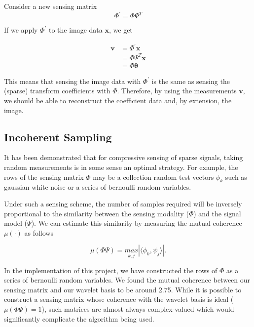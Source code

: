 \documentclass{IEEEtran}
\newcommand{\bfv}{\mathbf{v}}
\newcommand{\bfx}{\mathbf{x}}
\newcommand{\bftheta}{\mathbf{\theta}}
\begin{document}
Consider a new sensing matrix
\begin{equation}
  \label{eq:newsense}
  \Phi^\prime = \Phi \Psi^T
\end{equation}

If we apply $\Phi^\prime$ to the image data $\bfx$, we get

\begin{equation}
  \label{eq:newsenseapplied}
  \begin{split}
  \bfv &= \Phi^\prime \bfx \\
  &= \Phi \Psi^T \bfx \\
  &= \Phi \bftheta
  \end{split}
\end{equation}

This means that sensing the image data with $\Phi^\prime$ is the same as sensing the (sparse) transform coefficients with $\Phi$.  Therefore, by using the measurements $\bfv$, we should be able to reconstruct the coefficient data and, by extension, the image.

\subsection{Incoherent Sampling}
\label{sub:incoherence}

It has been demonstrated \cite{Candes06b,Baraniuk06} that for compressive sensing of sparse signals, taking random measurements is in some sense an optimal strategy. For example, the rows of the sensing matrix $\Phi$ may be a collection random test vectors ${\phi_k}$ such as gaussian white noise or a series of bernoulli random variables.

Under such a sensing scheme, the number of samples required will be inversely proportional to the similarity between the sensing modality ($\Phi$) and the signal model ($\Psi$).  We can estimate this similarity by measuring the mutual coherence $\mu(\cdot)$ as follows \cite{Donoho01,Candes06}

\begin{equation}
  \label{eq:coherence}
  \mu(\Phi \Psi) = \underset{k,j}{max}| \langle \phi_k, \psi_j \rangle | .
\end{equation}

In the implementation of this project, we have constructed the rows of $\Phi$ as a series of bernoulli random variables.  We found the mutual coherence between our sensing matrix and our wavelet basis to be around 2.75.  While it is possible to construct a sensing matrix whose coherence with the wavelet basis is ideal ($\mu(\Phi \Psi)=1$), such matrices are almost always complex-valued which would significantly complicate the algorithm being used.
\end{document}

